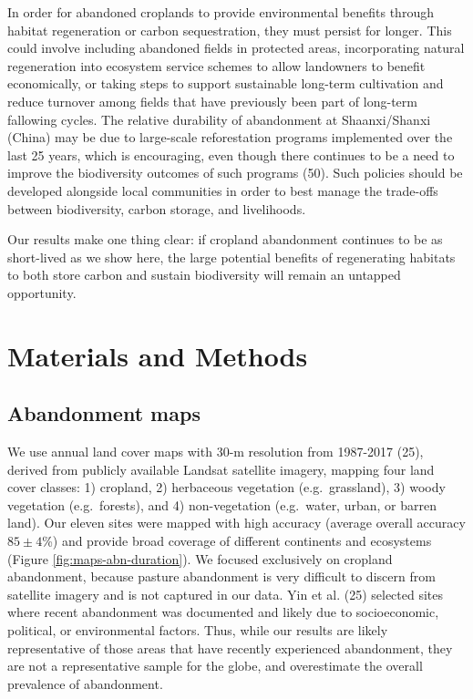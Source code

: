 \documentclass[9pt,twocolumn,twoside,lineno]{pnas-new}
\begin{document}
In order for abandoned croplands to provide environmental benefits through habitat regeneration or carbon sequestration, they must persist for longer.
This could involve including abandoned fields in protected areas, incorporating natural regeneration into ecosystem service schemes to allow landowners to benefit economically, or taking steps to support sustainable long-term cultivation and reduce turnover among fields that have previously been part of long-term fallowing cycles.
The relative durability of abandonment at Shaanxi/Shanxi (China) may be due to large-scale reforestation programs implemented over the last 25 years, which is encouraging, even though there continues to be a need to improve the biodiversity outcomes of such programs (50).
Such policies should be developed alongside local communities in order to best manage the trade-offs between biodiversity, carbon storage, and livelihoods.

Our results make one thing clear: if cropland abandonment continues to be as short-lived as we show here, the large potential benefits of regenerating habitats to both store carbon and sustain biodiversity will remain an untapped opportunity.

\hypertarget{methods}{%
\section{Materials and Methods}\label{methods}}

\hypertarget{abandonment-maps}{%
\subsection{Abandonment maps}\label{abandonment-maps}}

We use annual land cover maps with 30-m resolution from 1987-2017 (25), derived from publicly available Landsat satellite imagery, mapping four land cover classes: 1) cropland, 2) herbaceous vegetation (e.g.~grassland), 3) woody vegetation (e.g.~forests), and 4) non-vegetation (e.g.~water, urban, or barren land).
Our eleven sites were mapped with high accuracy (average overall accuracy \(85\pm4\)\%) and provide broad coverage of different continents and ecosystems (Figure \ref{fig:maps-abn-duration}).
We focused exclusively on cropland abandonment, because pasture abandonment is very difficult to discern from satellite imagery and is not captured in our data.
Yin et al. (25) selected sites where recent abandonment was documented and likely due to socioeconomic, political, or environmental factors.
Thus, while our results are likely representative of those areas that have recently experienced abandonment, they are not a representative sample for the globe, and overestimate the overall prevalence of abandonment.
\end{document}
